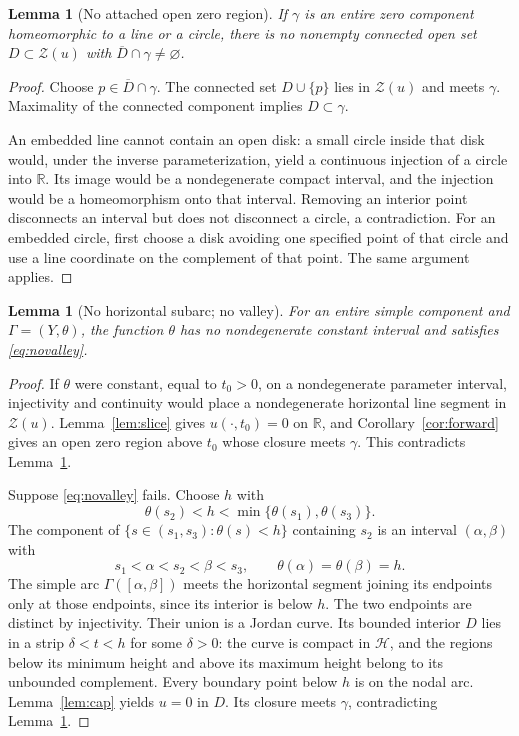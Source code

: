 \documentclass[11pt,reqno]{amsart}
\numberwithin{equation}{section}
\newtheorem{lemma}[theorem]{Lemma}
\theoremstyle{definition}
\theoremstyle{remark}
\newcommand{\R}{\mathbb R}
\newcommand{\HH}{\mathcal H}
\newcommand{\ZZ}{\mathcal Z}
\begin{document}
\begin{lemma}[No attached open zero region]\label{lem:attachment}
If $\gamma$ is an entire zero component homeomorphic to a line or a circle, there is no nonempty connected open set $D\subset\ZZ(u)$ with $\overline D\cap\gamma\neq\varnothing$.
\end{lemma}
\begin{proof}
Choose $p\in\overline D\cap\gamma$. The connected set $D\cup\{p\}$ lies in $\ZZ(u)$ and meets $\gamma$. Maximality of the connected component implies $D\subset\gamma$.

An embedded line cannot contain an open disk: a small circle inside that disk would, under the inverse parameterization, yield a continuous injection of a circle into $\R$. Its image would be a nondegenerate compact interval, and the injection would be a homeomorphism onto that interval. Removing an interior point disconnects an interval but does not disconnect a circle, a contradiction. For an embedded circle, first choose a disk avoiding one specified point of that circle and use a line coordinate on the complement of that point. The same argument applies.
\end{proof}

\begin{lemma}[No horizontal subarc; no valley]\label{lem:novalley}
For an entire simple component and $\Gamma=(Y,\theta)$, the function $\theta$ has no nondegenerate constant interval and satisfies \eqref{eq:novalley}.
\end{lemma}
\begin{proof}
If $\theta$ were constant, equal to $t_0>0$, on a nondegenerate parameter interval, injectivity and continuity would place a nondegenerate horizontal line segment in $\ZZ(u)$. Lemma~\ref{lem:slice} gives $u(\cdot,t_0)=0$ on $\R$, and Corollary~\ref{cor:forward} gives an open zero region above $t_0$ whose closure meets $\gamma$. This contradicts Lemma~\ref{lem:attachment}.

Suppose \eqref{eq:novalley} fails. Choose $h$ with
\[
 \theta(s_2)<h<\min\{\theta(s_1),\theta(s_3)\}.
\]
The component of $\{s\in(s_1,s_3):\theta(s)<h\}$ containing $s_2$ is an interval $(\alpha,\beta)$ with
\[
 s_1<\alpha<s_2<\beta<s_3,
 \qquad \theta(\alpha)=\theta(\beta)=h.
\]
The simple arc $\Gamma([\alpha,\beta])$ meets the horizontal segment joining its endpoints only at those endpoints, since its interior is below $h$. The two endpoints are distinct by injectivity. Their union is a Jordan curve. Its bounded interior $D$ lies in a strip $\delta<t<h$ for some $\delta>0$: the curve is compact in $\HH$, and the regions below its minimum height and above its maximum height belong to its unbounded complement. Every boundary point below $h$ is on the nodal arc. Lemma~\ref{lem:cap} yields $u=0$ in $D$. Its closure meets $\gamma$, contradicting Lemma~\ref{lem:attachment}.
\end{proof}
\end{document}
